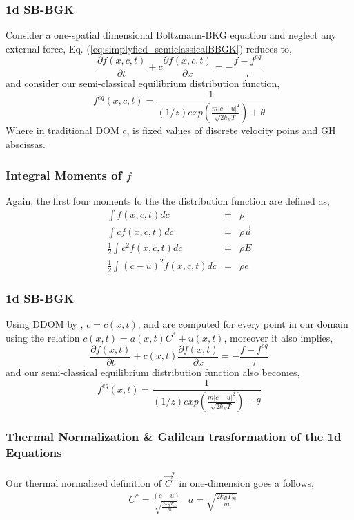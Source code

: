 \begin{frame}
	\frametitle{1d SB-BGK}
	Consider a one-spatial dimensional Boltzmann-BKG equation and neglect any external force, Eq. (\ref{eq:simplyfied_semiclassicalBBGK}) reduces to,
	\begin{equation}
	\frac{\partial f(x,c,t)}{\partial t} + c \frac{\partial f(x,c,t)}{\partial x} = -\frac{f - f^{eq}}{\tau}
	\label{eq:sbbgk1d}
	\end{equation}
	and consider our semi-classical equilibrium distribution function,
	\begin{equation}
	f^{eq} (x,c,t) = \frac{1}{(1/z) exp( \frac{ m \left | c - u \right |^2}{\sqrt{2 k_B T}} )+\theta}
	\end{equation}
	Where in traditional DOM $c$, is fixed values of discrete velocity poins and GH abscissas.
\end{frame}

\begin{frame}
	\frametitle{Integral Moments of $f$}
	Again, the first four moments fo the the distribution function are defined as,
	\begin{eqnarray}
	\int f(x,c,t) d c  &=& \rho \\
	\int c f(x,c,t) d c  &=& \rho \vec{u} \nonumber \\
	\frac{1}{2} \int c^2 f(x,c,t) d c  &=& \rho E \nonumber \\
	\frac{1}{2} \int (c-u)^2 f(x,c,t) d c  &=& \rho e \nonumber
	\end{eqnarray}
\end{frame}

\begin{frame}
	\frametitle{1d SB-BGK}
	Using DDOM by \cite{Hsu201239}, $c = c(x,t)$, and are computed for every point in our domain using the relation $c(x,t) = a(x,t) C^* + u(x,t)$, moreover it also implies,
	\begin{equation}
	\frac{\partial f(x,t)}{\partial t} + c(x,t) \frac{\partial f(x,t)}{\partial x} = -\frac{f - f^{eq}}{\tau}
	\label{eq:sbbgk1d_DDOM}
	\end{equation}
	and our semi-classical equilibrium distribution function also becomes,
	\begin{equation}
	f^{eq} (x,t) = \frac{1}{(1/z) exp( \frac{ m \left | c - u \right |^2}{\sqrt{2 k_B T}} )+\theta}
	\end{equation}
\end{frame}

\begin{frame}
	\frametitle{Thermal Normalization \& Galilean trasformation of the 1d Equations}
	Our thermal normalized definition of $\vec{C}^*$ in one-dimension goes a follows,
	\begin{align*}
	& C^* = \frac{(c-u)}{\sqrt{\frac{2k_BT_\infty}{m}}} & a = \sqrt{\frac{2k_BT_\infty}{m}} 
	\end{align*}
\end{frame}
	

